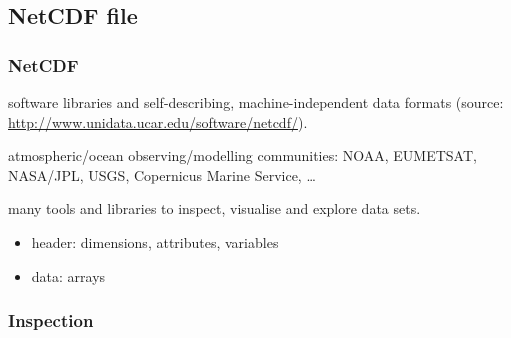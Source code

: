 \subsection{NetCDF file}
\begin{frame}
\frametitle{NetCDF}

\begin{description}
\item<1->[Definition:] software libraries and self-describing, machine-independent data formats (source: \url{http://www.unidata.ucar.edu/software/netcdf/}).
\item<2->[Users:] atmospheric/ocean observing/modelling communities:  NOAA, EUMETSAT, NASA/JPL, USGS, Copernicus Marine Service, \ldots
\item<3->[Tools:] many tools and libraries to inspect, visualise and explore data sets.
\item<4->[Structure:] \begin{itemize}
\item header: dimensions, attributes, variables 
\item data: arrays
\end{itemize}
  
\end{description}

\end{frame}

\subsubsection{Inspection}

